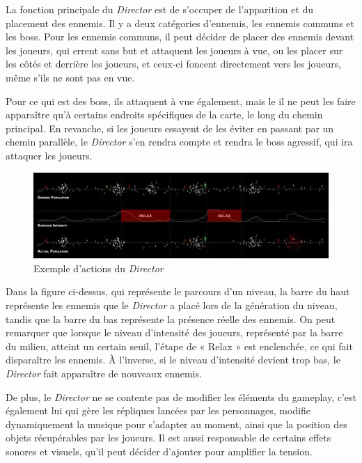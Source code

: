 \documentclass[a4paper, 12pt]{article} %
\begin{document}
La fonction principale du \textit{Director} est de s’occuper de l’apparition et du placement des ennemis. Il y a deux catégories d’ennemis, les ennemis communs et les boss. Pour les ennemis communs, il peut décider de placer des ennemis devant les joueurs, qui errent sans but et attaquent les joueurs à vue, ou les placer sur les côtés et derrière les joueurs, et ceux-ci foncent directement vers les joueurs, même s’ils ne sont pas en vue.

Pour ce qui est des boss, ils attaquent à vue également, mais le il ne peut les faire apparaître qu’à certains endroits spécifiques de la carte, le long du chemin principal. En revanche, si les joueurs essayent de les éviter en passant par un chemin parallèle, le \textit{Director} s’en rendra compte et rendra le boss agressif, qui ira attaquer les joueurs.

\begin{figure}[!h]%
	\begin{center} 
		\includegraphics[width=1.0\columnwidth]{images/aiDirector.jpg}%
		\caption{Exemple d'actions du \textit{Director}}%
	\end{center}
\end{figure}

Dans la figure ci-dessus, qui représente le parcours d'un niveau, la barre du haut représente les ennemis que le \textit{Director} a placé lors de la génération du niveau, tandis que la barre du bas représente la présence réelle des ennemis. On peut remarquer que lorsque le niveau d'intensité des joueurs, représenté par la barre du milieu, atteint un certain seuil, l'étape de « Relax » est enclenchée, ce qui fait disparaître les ennemis. À l'inverse, si le niveau d'intensité devient trop bas, le \textit{Director} fait apparaître de nouveaux ennemis.

\newpage
De plus, le \textit{Director} ne se contente pas de modifier les éléments du gameplay, c’est également lui qui gère les répliques lancées par les personnages, modifie dynamiquement la musique pour s’adapter au moment, ainsi que la position des objets récupérables par les joueurs. Il est aussi responsable de certains effets sonores et visuels, qu’il peut décider d’ajouter pour amplifier la tension.
\end{document}
